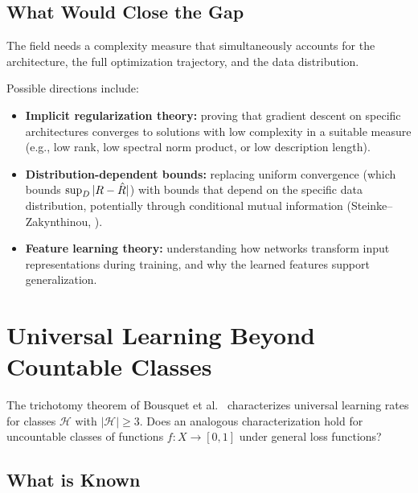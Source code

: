 \subsection{What Would Close the Gap}

The field needs a complexity measure that simultaneously accounts for the
architecture, the full optimization trajectory, and the data distribution.

Possible directions include:
\begin{itemize}[leftmargin=*]
\item \textbf{Implicit regularization theory:} proving that gradient descent
  on specific architectures converges to solutions with low complexity
  in a suitable measure (e.g., low rank, low spectral norm product, or
  low description length).
\item \textbf{Distribution-dependent bounds:} replacing uniform convergence
  (which bounds $\sup_D |R - \hat{R}|$) with bounds that depend on the
  specific data distribution, potentially through conditional mutual
  information (Steinke--Zakynthinou, ).
\item \textbf{Feature learning theory:} understanding how networks transform
  input representations during training, and why the learned features
  support generalization.
\end{itemize}



\section{Universal Learning Beyond Countable Classes}
\label{sec:universal-frontiers}

\begin{openprob}
\label{op:universal-uncountable}
The trichotomy theorem of Bousquet et
al.~\cite{BousquetHannekeMoranVanHandelYehudayoff2021} characterizes
universal learning rates for classes $\mathcal{H}$ with $|\mathcal{H}| \geq 3$.
Does an analogous characterization hold for uncountable classes of functions
$f \colon X \to [0,1]$ under general loss functions?
\end{openprob}

\subsection{What is Known}

